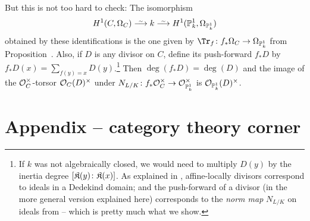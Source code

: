 \documentclass[a4paper,parskip=half,numbers=enddot, DIV=12]{scrreprt}
\begin{document}
But this is not too hard to check: The isomorphism 
\begin{align*}
	H^1(C,\Omega_C)\isomorphism k\isomorphism H^1(\IP_k^1,\Omega_{\IP_k^1})
\end{align*}
obtained by these identifications is the one given by $\Tr_f\colon f_*\Omega_C\morphism\Omega_{\IP_k^1}$ from Proposition~. Also, if $D$ is any divisor on $C$, define its push-forward $f_*D$ by $f_*D(x)=\sum_{f(y)=x}D(y)$.\footnote{If $k$ was not algebraically closed, we would need to multiply $D(y)$ by the inertia degree $[\mathfrak{K}(y)\colon \mathfrak{K}(x)]$. As explained in \cite[Ch.\ I, \S 12]{NEUKIRCH}, affine-locally divisors correspond to ideals in a Dedekind domain; and the push-forward of a divisor (in the more general version explained here) corresponds to the \emph{norm map} $N_{L/K}$ on ideals from \cite[p.\ 197]{NEUKIRCH} -- which is pretty much what we show.} Then $\deg(f_*D)=\deg(D)$ and the image of the $\mathcal{O}_C^\times$-torsor $\mathcal{O}_C(D)^\times$ under $N_{L/K}\colon f_*\Oo_C^\times\morphism\Oo_{\IP_k^1}^\times$ is $\mathcal{O}_{\mathbb{P}_k^1}(D)^\times$.




\appendix
\chapter{Appendix -- category theory corner}
\setcounter{thm}{0}
\renewcommand*{\thethm}{\Alph{thm}}
\end{document}

